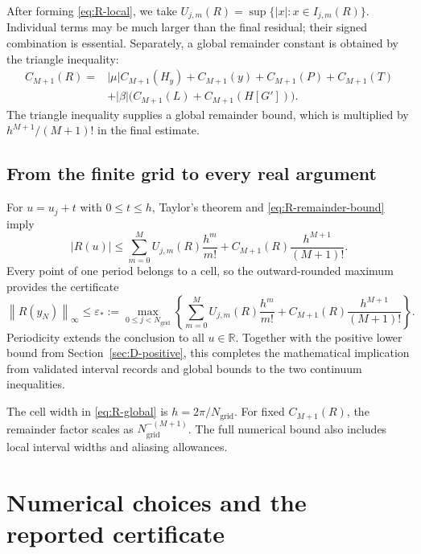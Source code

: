 \documentclass[11pt]{article}
\numberwithin{equation}{section}
\newcommand{\norm}[1]{\left\|#1\right\|_{\infty}}
\newcommand{\HH}{H_y}
\newcommand{\Ngrid}{N_{\mathrm{grid}}}
\begin{document}
After forming \eqref{eq:R-local}, we take
$U_{j,m}(R)=\sup\{|x|:x\in I_{j,m}(R)\}$. Individual terms may be much
larger than the final residual; their signed combination is essential.
Separately, a global remainder constant is obtained by the triangle
inequality:
\begin{equation}
 \begin{split}
 C_{M+1}(R)={}&|\mu|C_{M+1}(\HH)+C_{M+1}(y)+C_{M+1}(P)+C_{M+1}(T)\\
 &+|\beta|\bigl(C_{M+1}(L)+C_{M+1}(H[G'])\bigr).
 \end{split}
 \label{eq:R-remainder-bound}
\end{equation}
The triangle inequality supplies a global remainder bound, which is
multiplied by $h^{M+1}/(M+1)!$ in the final estimate.

\subsection{From the finite grid to every real argument}

For $u=u_j+t$ with $0\leq t\leq h$, Taylor's theorem and
\eqref{eq:R-remainder-bound} imply
\begin{equation}
 |R(u)|\leq\sum_{m=0}^{M}U_{j,m}(R)\frac{h^m}{m!}
 +C_{M+1}(R)\frac{h^{M+1}}{(M+1)!}.
 \label{eq:R-cell}
\end{equation}
Every point of one period belongs to a cell, so the outward-rounded
maximum provides the certificate
\begin{equation}
 \boxed{\norm{R(y_N)}\leq\varepsilon_*:=
 \max_{0\leq j<\Ngrid}\left\{
 \sum_{m=0}^{M}U_{j,m}(R)\frac{h^m}{m!}
 +C_{M+1}(R)\frac{h^{M+1}}{(M+1)!}\right\}.}
 \label{eq:R-global}
\end{equation}
Periodicity extends the conclusion to all $u\in\mathbb R$. Together with
the positive lower bound from Section~\ref{sec:D-positive}, this completes
the mathematical implication from validated interval records and global
bounds to the two continuum inequalities.

The cell width in \eqref{eq:R-global} is $h=2\pi/\Ngrid$. For fixed
$C_{M+1}(R)$, the remainder factor scales as $\Ngrid^{-(M+1)}$. The
full numerical bound also includes local interval widths and aliasing
allowances.

\section{Numerical choices and the reported certificate}
\label{sec:numerics}
\end{document}
